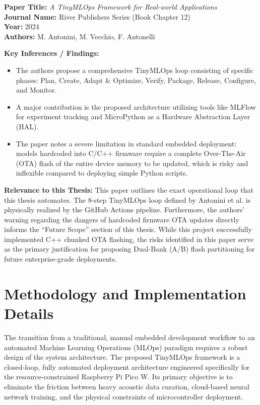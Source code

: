 \documentclass[11pt,a4paper,openany]{book}
\begin{document}
\vspace{2em}
\noindent\textbf{Paper Title:} \textit{A TinyMLOps Framework for Real-world Applications} \cite{11}\\
\textbf{Journal Name:} River Publishers Series (Book Chapter 12)\\
\textbf{Year:} 2024\\
\textbf{Authors:} M. Antonini, M. Vecchio, F. Antonelli

\vspace{0.5em}
\noindent\textbf{Key Inferences / Findings:}
\begin{itemize}
    \item The authors propose a comprehensive TinyMLOps loop consisting of specific phases: Plan, Create, Adapt \& Optimize, Verify, Package, Release, Configure, and Monitor.
    \item A major contribution is the proposed architecture utilizing tools like MLFlow for experiment tracking and MicroPython as a Hardware Abstraction Layer (HAL).
    \item The paper notes a severe limitation in standard embedded deployment: models hardcoded into C/C++ firmware require a complete Over-The-Air (OTA) flash of the entire device memory to be updated, which is risky and inflexible compared to deploying simple Python scripts.
\end{itemize}

\vspace{0.5em}
\noindent\textbf{Relevance to this Thesis:} This paper outlines the exact operational loop that this thesis automates. The 8-step TinyMLOps loop defined by Antonini et al. is physically realized by the GitHub Actions pipeline. Furthermore, the authors' warning regarding the dangers of hardcoded firmware OTA updates directly informs the ``Future Scope'' section of this thesis. While this project successfully implemented C++ chunked OTA flashing, the risks identified in this paper serve as the primary justification for proposing Dual-Bank (A/B) flash partitioning for future enterprise-grade deployments.

\chapter{Methodology and Implementation Details}

The transition from a traditional, manual embedded development workflow to an automated Machine Learning Operations (MLOps) paradigm requires a robust design of the system architecture. The proposed TinyMLOps framework is a closed-loop, fully automated deployment architecture engineered specifically for the resource-constrained Raspberry Pi Pico W. Its primary objective is to eliminate the friction between heavy acoustic data curation, cloud-based neural network training, and the physical constraints of microcontroller deployment.
\end{document}
